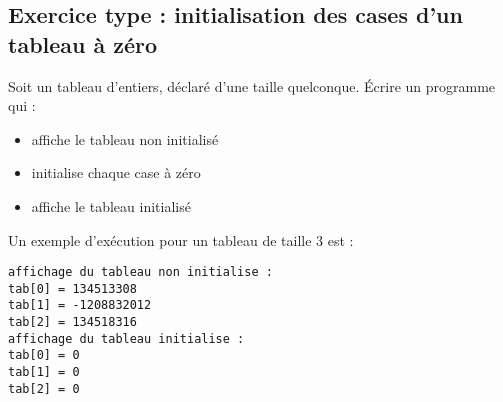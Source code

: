\subsection{Exercice type : initialisation des cases d'un tableau à zéro}

Soit un tableau d'entiers, déclaré d'une taille quelconque. Écrire un programme qui :
\begin{itemize}
\item affiche le tableau non initialisé
\item initialise chaque case à zéro
\item affiche le tableau initialisé
\end{itemize}

Un exemple d'exécution pour un tableau de taille 3 est :
\begin{small}
\begin{verbatim}
affichage du tableau non initialise :
tab[0] = 134513308
tab[1] = -1208832012
tab[2] = 134518316
affichage du tableau initialise :
tab[0] = 0
tab[1] = 0
tab[2] = 0
\end{verbatim}
\end{small}
